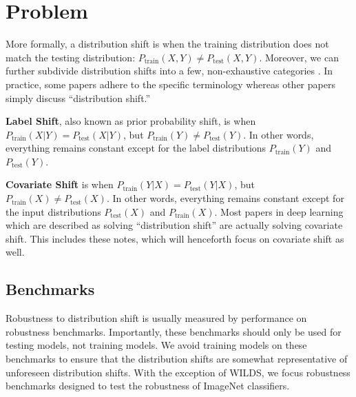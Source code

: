 \documentclass{article}
\begin{document}
\section{Problem}
More formally, a distribution shift is when the training distribution does not match the testing distribution: $P_\text{train}(X,Y) \neq P_\text{test}(X,Y)$. Moreover, we can further subdivide distribution shifts into a few, non-exhaustive categories \cite{quinonero2009dataset}. In practice, some papers adhere to the specific terminology whereas other papers simply discuss ``distribution shift.''

\textbf{Label Shift}, also known as prior probability shift, is when $P_\text{train}(X|Y) = P_\text{test}(X|Y)$, but $P_\text{train}(Y) \neq P_\text{test}(Y)$. In other words, everything remains constant except for the label distributions $P_\text{train}(Y)$ and $P_\text{test}(Y)$. 

\textbf{Covariate Shift} is when $P_\text{train}(Y|X) = P_\text{test}(Y|X)$, but $P_\text{train}(X) \neq P_\text{test}(X)$. In other words, everything remains constant except for the input distributions $P_\text{test}(X)$ and $P_\text{train}(X)$. Most papers in deep learning which are described as solving ``distribution shift'' are actually solving covariate shift. This includes these notes, which will henceforth focus on covariate shift as well.



\subsection{Benchmarks}
Robustness to distribution shift is usually measured by performance on robustness benchmarks. Importantly, these benchmarks should only be used for testing models, not training models. We avoid training models on these benchmarks to ensure that the distribution shifts are somewhat representative of unforeseen distribution shifts. With the exception of WILDS, we focus robustness benchmarks designed to test the robustness of ImageNet classifiers.
\end{document}
